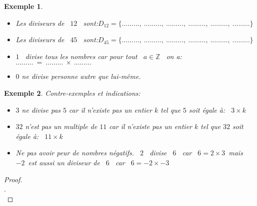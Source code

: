 \documentclass[a4paper,10.5pt]{article}
\newtheorem{prop}{Propriété}
\newtheorem{ex}{Exemple}
\begin{document}
\begin{ex}\hfill\\
	\begin{itemize}
		\item[$\square$] Les diviseurs de ~$12$~ sont:\quad $D_{12}=\bigg\{\dots\dots\dots,~\dots\dots\dots,~\dots\dots\dots,~\dots\dots\dots,~\dots\dots\dots,~\dots\dots\dots\bigg\}$\\
		\item[$\square$] Les diviseurs de ~$45$~ sont:\quad $D_{45}=\bigg\{\dots\dots\dots,~\dots\dots\dots,~\dots\dots\dots,~\dots\dots\dots,~\dots\dots\dots,~\dots\dots\dots\bigg\}$\\
		\item[$\square$] $1$~ divise tous les nombres car pour tout ~$a\in\mathbb{Z}$~ on a:\quad $\dots\dots\dots \ = \ \dots\dots\dots \ \times \ \dots\dots\dots $\\
		\item[$\square$] $0$ ne divise personne autre que lui-même.\\
	\end{itemize}
\end{ex}

\begin{ex}
	Contre-exemples et indications:\\
	\begin{itemize}
		\item[$\square$] $3$ ne divise pas $5$ car il n'existe pas un entier $k$ tel que $5$ soit égale à:~ $3\times k$\\
		\item[$\square$] $32$ n'est pas un multiple de $11$ car il n'existe pas un entier $k$ tel que $32$ soit égale à:~ $11\times k$\\
		\item[$\square$] Ne pas avoir peur de nombres négatifs. ~$2$~ divise ~$6$~ car ~$6=2 \times 3$~mais ~$-2$~est aussi un diviseur de ~$6$~ car ~$6=-2 \times -3$ 
	\end{itemize}
\end{ex}	

\noindent{}

\begin{proof}\hfil\\
	
		\noindent.\dotfill \\
\end{proof}
\end{document}
